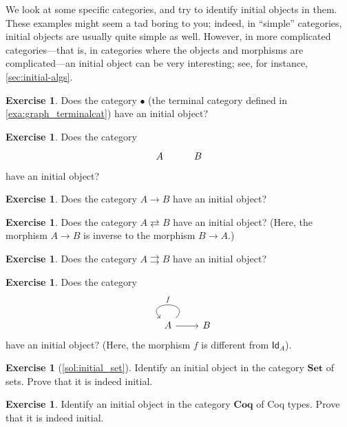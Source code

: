 \documentclass[a4paper,10pt]{scrartcl}
\theoremstyle{plain}
\theoremstyle{definition}
\newtheorem{exer}[thm]{Exercise}
\newcommand{\cfont}[1]{\ensuremath{\mathsf{#1}}}
\newcommand{\Catb}[1]{\mathbf{#1}}
\newcommand{\SET}{\Catb{Set}}
\newcommand{\COQ}{\Catb{Coq}}
\newcommand{\Id}[1][]{\cfont{Id}_{#1}}
\begin{document}
We look at some specific categories, and try to identify initial objects in them.
These examples might seem a tad boring to you;
indeed, in ``simple'' categories, initial objects are usually quite simple as well.
However, in more complicated categories---that is, in categories where the objects and morphisms are complicated---an initial object can be very interesting; see, for instance, \cref{sec:initial-algs}.

\begin{exer}
  Does the category $\bullet$ (the terminal category defined in \cref{exa:graph_terminalcat}) have an initial object?
\end{exer}

\begin{exer}
  Does the category 
  \[ 
  \begin{tikzcd}
  	A & B
  \end{tikzcd}  
   \] 
  have an initial object?
\end{exer}


\begin{exer}
  Does the category $A \to B$ have an initial object?
\end{exer}

\begin{exer}
  Does the category $A \rightleftarrows B$ have an initial object? (Here, the morphism $A \to B$ is inverse to the morphism $B \to A$.)
\end{exer}

\begin{exer}
  Does the category $A \rightrightarrows B$ have an initial object?
\end{exer}

\begin{exer}
  Does the category 
  \[
  \begin{tikzcd}
  A \arrow[r] \arrow[loop, swap, looseness=4, "f"] & B
  \end{tikzcd}
  \]
  have an initial object? (Here, the morphism $f$ is different from $\Id[A]$).
\end{exer}

\begin{exer}[\cref{sol:initial_set}]\label{exer:initial_set}
  Identify an initial object in the category $\SET$ of sets.
  Prove that it is indeed initial.
\end{exer}

\begin{exer}
  Identify an initial object in the category $\COQ$ of Coq types.
  Prove that it is indeed initial.
\end{exer}
\end{document}
